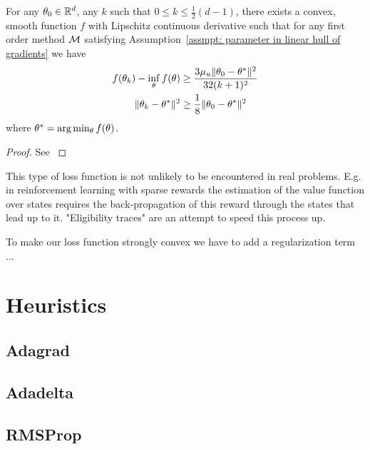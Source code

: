 \begin{theorem}
	For any \(\theta_0\in\mathbb{R}^d\), any \(k\) such that \(0\le k\le \tfrac12 (d-1)\),
	there exists a convex, smooth function \(f\) with Lipschitz continuous
	derivative such that for any first order method \(\mathcal{M}\)
	satisfying Assumption~\ref{assmpt: parameter in linear hull of gradients}
	we have
	\begin{subequations}
	\begin{align}
		f(\theta_k) - \inf_\theta f(\theta)
		&\ge \frac{3\mu_u \|\theta_0 - \theta^*\|^2}{32(k+1)^2} \\
		\|\theta_k -\theta^*\|^2 
		&\ge \frac18 \|\theta_0 - \theta^*\|^2
	\end{align}
	\end{subequations}
	where \(\theta^* = \arg\min_\theta f(\theta)\).
\end{theorem}
\begin{proof}
	See \textcite[Theorem 2.1.7]{nesterovLecturesConvexOptimization2018}
\end{proof}

\begin{remark}
	This type of loss function is not unlikely to be encountered in real
	problems. E.g. in reinforcement learning with sparse rewards the estimation
	of the value function over states requires the back-propagation of this
	reward through the states that lead up to it. "Eligibility traces"
	\parencite[Chapter 12]{suttonReinforcementLearningIntroduction2018}
	are an attempt to speed this process up.
\end{remark}

To make our loss function strongly convex we have to add a regularization term
...

\section{Heuristics}

\subsection{Adagrad}

\subsection{Adadelta}

\subsection{RMSProp}


\endinput